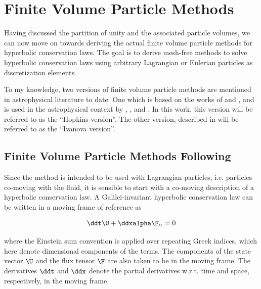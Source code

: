\chapter{Finite Volume Particle Methods}\label{chap:FVPM}


Having discussed the partition of unity and the associated particle volumes, we can now move on
towards deriving the actual finite volume particle methods for hyperbolic conservation laws. The
goal is to derive mesh-free methods to solve hyperbolic conservation laws using arbitrary
Lagrangian or Eulerian particles as discretization elements.

To my knowledge, two versions of finite volume particle methods are mentioned in astrophysical
literature to date: One which is based on the works of
\citet{lansonRenormalizedMeshfreeSchemes2008a} and \citet{lansonRenormalizedMeshfreeSchemes2008} ,
and is used in the astrophysical context by \citet{gaburovAstrophysicalWeightedParticle2011},
\citet{hopkinsGIZMONewClass2015}, and \citet{hubberGANDALFGraphicalAstrophysics2018}. In this work,
this version will be referred to as the ``Hopkins version''. The other version, described in
\citet{ivanovaCommonEnvelopeEvolution2013} will be referred to as the ``Ivanova version''.





\section{Finite Volume Particle Methods Following \citet{hopkinsGIZMONewClass2015}}
\label{chap:meshless-hopkins}

Since the method is intended to be used with Lagrangian particles, i.e. particles co-moving with
the fluid, it is sensible to start with a co-moving description of a hyperbolic conservation law.
A Galilei-invariant hyperbolic conservation law can be written in a moving frame of reference as

\begin{align}
    \ddt \U + \ddxalpha \F_\alpha = 0
\end{align}

where the Einstein sum convention is applied over repeating Greek indices, which here denote
dimensional components of the terms. The components of the state vector $\U$ and the flux tensor
$\F$ are also taken to be in the moving frame.
The derivatives $\ddt$ and $\ddx$ denote the partial derivatives w.r.t. time and space,
respectively, in the moving frame.


